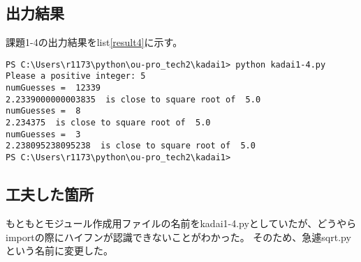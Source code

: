 \documentclass{ltjsarticle}
\begin{document}
\subsection*{出力結果}
課題1-4の出力結果をlist\ref{result4}に示す。
\begin{lstlisting}[caption=output, label=result4]
PS C:\Users\r1173\python\ou-pro_tech2\kadai1> python kadai1-4.py
Please a positive integer: 5
numGuesses =  12339
2.2339000000003835  is close to square root of  5.0
numGuesses =  8
2.234375  is close to square root of  5.0
numGuesses =  3
2.238095238095238  is close to square root of  5.0
PS C:\Users\r1173\python\ou-pro_tech2\kadai1>
\end{lstlisting}

\subsection*{工夫した箇所}
もともとモジュール作成用ファイルの名前をkadai1-4.pyとしていたが、どうやらimportの際にハイフンが認識できないことがわかった。
そのため、急遽sqrt.pyという名前に変更した。
\end{document}

